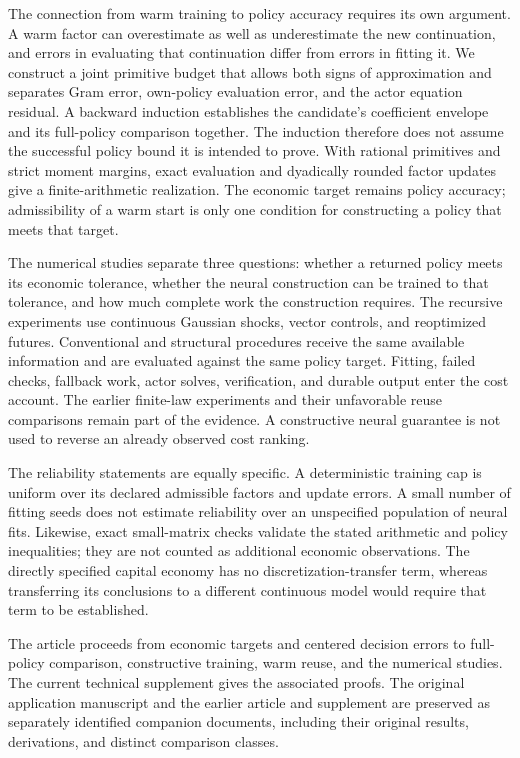 The connection from warm training to policy accuracy requires its own
argument. A warm factor can overestimate as well as underestimate the new
continuation, and errors in evaluating that continuation differ from errors
in fitting it. We construct a joint primitive budget that allows both signs
of approximation and separates Gram error, own-policy evaluation error, and
the actor equation residual. A backward induction establishes the candidate's
coefficient envelope and its full-policy comparison together. The induction
therefore does not assume the successful policy bound it is intended to
prove. With rational primitives and strict moment margins, exact evaluation
and dyadically rounded factor updates give a finite-arithmetic realization.
The economic target remains policy accuracy; admissibility of a warm start
is only one condition for constructing a policy that meets that target.

The numerical studies separate three questions: whether a returned policy
meets its economic tolerance, whether the neural construction can be trained
to that tolerance, and how much complete work the construction requires.
The recursive experiments use continuous Gaussian shocks, vector controls,
and reoptimized futures. Conventional and structural procedures receive the
same available information and are evaluated against the same policy target.
Fitting, failed checks, fallback work, actor solves, verification, and durable
output enter the cost account. The earlier finite-law experiments and their
unfavorable reuse comparisons remain part of the evidence. A constructive
neural guarantee is not used to reverse an already observed cost ranking.

The reliability statements are equally specific. A deterministic training
cap is uniform over its declared admissible factors and update errors. A
small number of fitting seeds does not estimate reliability over an
unspecified population of neural fits. Likewise, exact small-matrix checks
validate the stated arithmetic and policy inequalities; they are not counted
as additional economic observations. The directly specified capital economy
has no discretization-transfer term, whereas transferring its conclusions
to a different continuous model would require that term to be established.

The article proceeds from economic targets and centered decision errors to
full-policy comparison, constructive training, warm reuse, and the numerical
studies. The current technical supplement gives the associated proofs.
The original application manuscript and the earlier article and supplement
are preserved as separately identified companion documents, including their
original results, derivations, and distinct comparison classes.

